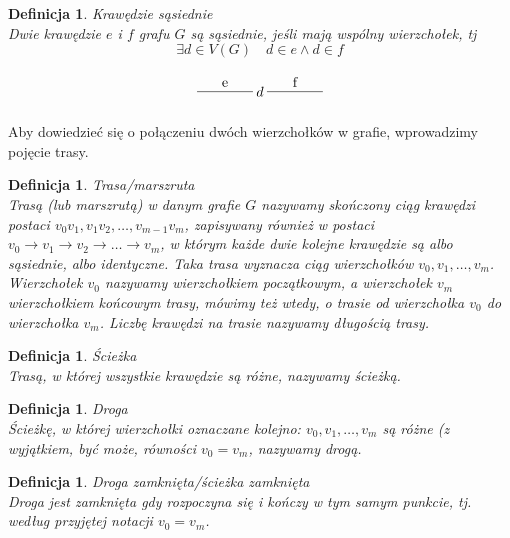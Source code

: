 \documentclass[12pt,a4paper]{report}
\newtheorem{definition}[theorem]{Definicja}
\begin{document}
\begin{definition}{Krawędzie sąsiednie \cite[Rozdział 2]{wilson2008}}\\
Dwie krawędzie $e$ i $f$ grafu $G$ są sąsiednie, jeśli mają wspólny wierzchołek, tj
$$
\exists{d}\in V(G) \quad d \in e \land d\in f
$$

$$
\begin{tikzpicture}[scale=.7]
  \draw (-1.75,0)-- node[above] {f} ++(2,0);
  \draw node(d) at (-2,0) {$d$};
  \draw (-4.25,0) --node[above] {e} ++(2,0);
\end{tikzpicture}
$$
\end{definition}



Aby dowiedzieć się o połączeniu dwóch wierzchołków w grafie, wprowadzimy pojęcie trasy.

\begin{definition}{Trasa/marszruta \cite[Rozdział 3]{wilson2008}}\\
Trasą (lub marszrutą) w danym grafie $G$ nazywamy skończony ciąg krawędzi postaci \newline
$v_{0}v_{1}, v_{1}v_{2}, \ldots,v_{m-1}v_{m}$, zapisywany również w postaci $v_{0} \rightarrow{} v_{1} \rightarrow{} v_{2} \rightarrow{} \ldots \rightarrow{} v_{m}$, w którym każde dwie kolejne krawędzie są albo sąsiednie, albo identyczne. Taka trasa wyznacza ciąg wierzchołków $v_{0}, v_{1}, \ldots, v_{m}$. Wierzchołek $v_{0}$ nazywamy wierzchołkiem początkowym, a wierzchołek $v_{m}$ wierzchołkiem końcowym trasy, mówimy też wtedy, o trasie od wierzchołka $v_{0}$ do wierzchołka $v_{m}$. Liczbę krawędzi na trasie nazywamy długością trasy. 
\end{definition}

\begin{definition}{Ścieżka \cite[Rozdział 3]{wilson2008}}\\
Trasą, w której wszystkie krawędzie są różne, nazywamy ścieżką.
\end{definition}


\begin{definition}{Droga \cite[Rozdział 3]{wilson2008}}\\
Ścieżkę, w której wierzchołki  oznaczane kolejno: 
$v_{0}, v_{1}, \ldots, v_{m}$ są różne (z wyjątkiem, być może, równości $v_{0}=v_{m}$, nazywamy drogą. 
\end{definition}


\begin{definition}{Droga zamknięta/ścieżka zamknięta \cite[Rozdział 3]{wilson2008}}\\
Droga jest zamknięta gdy rozpoczyna się i kończy w tym samym punkcie, tj. według przyjętej notacji $v_{0}=v_{m}$.
\end{definition}
\end{document}
